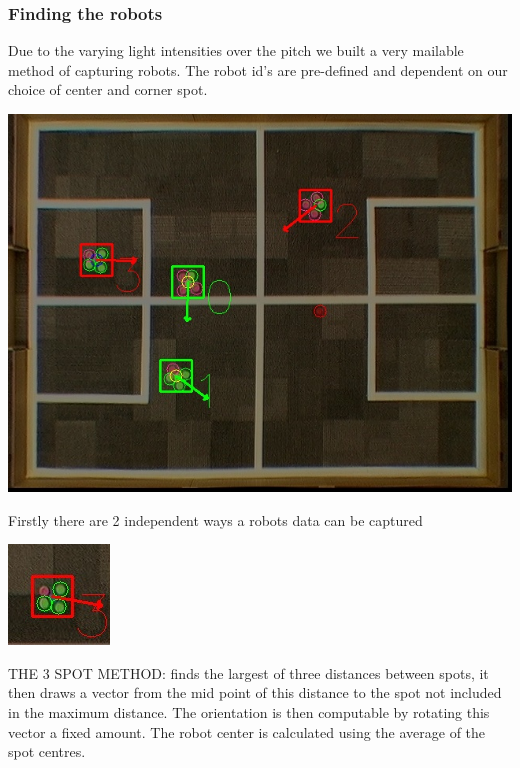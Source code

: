\documentclass[a4paper,12pt]{article}
\begin{document}
\subsubsection{Finding the robots}
Due to the varying light intensities over the pitch we built a very mailable method of capturing robots. The robot id's are pre-defined and dependent on our choice of center and corner spot. \newline
\begin{center}
\includegraphics[scale=0.5]{ex1.jpg}\newline
\end{center}
Firstly there are 2 independent ways a robots data can be captured \newline \newline
\begin{minipage}{0.2\textwidth}
\includegraphics[scale=0.7]{3spot.jpg}
\end{minipage}
\begin{minipage}{0.8\textwidth}\raggedleft   
THE 3 SPOT METHOD: finds the largest of three distances between spots, it then draws a vector from the mid point of this distance to the spot not included in the maximum distance. The orientation is then computable by rotating this vector a fixed amount. The robot center is calculated using the average of the spot centres.
\end{minipage}\newline \newline
\end{document}
